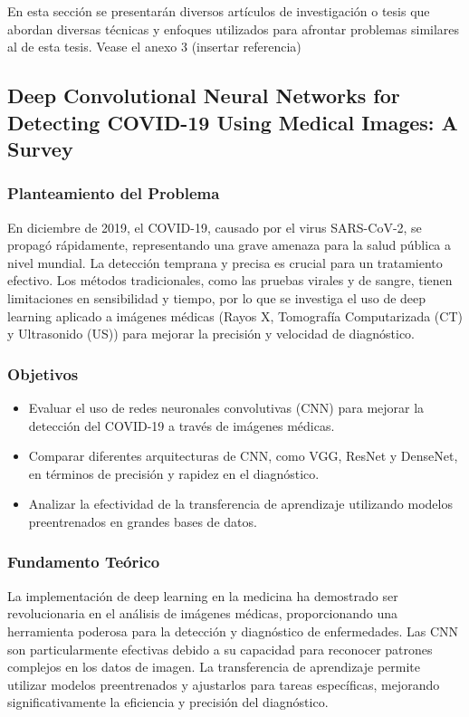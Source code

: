 En esta sección se presentarán diversos artículos de investigación o tesis que abordan diversas técnicas y enfoques utilizados para afrontar problemas similares al de esta tesis. Vease el anexo 3 (insertar referencia)

\subsection{Deep Convolutional Neural Networks for Detecting COVID-19 Using Medical Images: A Survey \citep{sharma2020deep}} 

\subsubsection{Planteamiento del Problema}

En diciembre de 2019, el COVID-19, causado por el virus SARS-CoV-2, se propagó rápidamente, representando una grave amenaza para la salud pública a nivel mundial. La detección temprana y precisa es crucial para un tratamiento efectivo. Los métodos tradicionales, como las pruebas virales y de sangre, tienen limitaciones en sensibilidad y tiempo, por lo que se investiga el uso de deep learning aplicado a imágenes médicas (Rayos X, Tomografía Computarizada (CT) y Ultrasonido (US)) para mejorar la precisión y velocidad de diagnóstico.

\subsubsection{Objetivos}
\begin{itemize}
 \item Evaluar el uso de redes neuronales convolutivas (CNN) para mejorar la detección del COVID-19 a través de imágenes médicas.
 \item Comparar diferentes arquitecturas de CNN, como VGG, ResNet y DenseNet, en términos de precisión y rapidez en el diagnóstico. 
\item Analizar la efectividad de la transferencia de aprendizaje utilizando modelos preentrenados en grandes bases de datos. 
\end{itemize}

\subsubsection{Fundamento Teórico}

La implementación de deep learning en la medicina ha demostrado ser revolucionaria en el análisis de imágenes médicas, proporcionando una herramienta poderosa para la detección y diagnóstico de enfermedades. Las CNN son particularmente efectivas debido a su capacidad para reconocer patrones complejos en los datos de imagen. La transferencia de aprendizaje permite utilizar modelos preentrenados y ajustarlos para tareas específicas, mejorando significativamente la eficiencia y precisión del diagnóstico.

